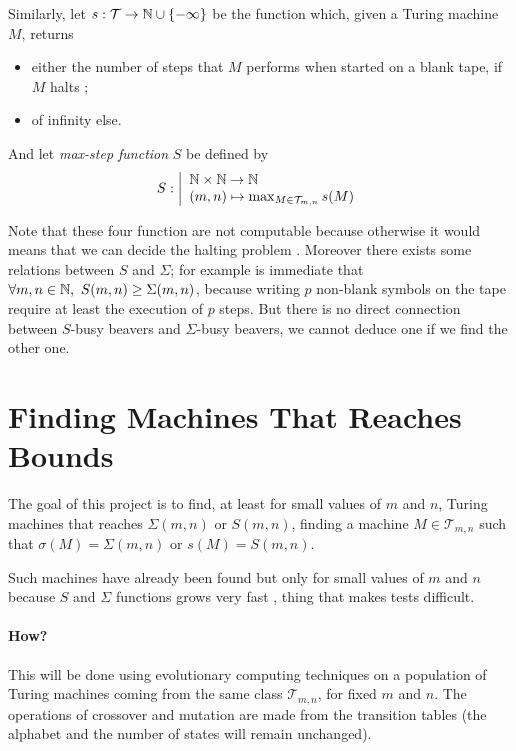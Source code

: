\documentclass{article}
\begin{document}
Similarly, let $s : \mathcal{T} \to \mathbb{N} \cup \{-\infty\}$ be the function which, given a Turing machine $M$, returns
\begin{itemize}
\item either the number of steps that $M$ performs when started on a blank tape, if $M$ halts ;
\item of infinity else.
\end{itemize}

And let \emph{max-step function} $S$ be defined by
\[
S : \left |
\begin{array}{l}
  \mathbb{N} \times \mathbb{N} \to \mathbb{N}\\
(m,n) \mapsto \max_{M \in \mathcal{T}_{m,n}} s(M)
\end{array}
\right .
\]

Note that these four function are not computable because otherwise it would means that we can decide the halting problem \cite{rado}. Moreover there exists some relations between $S$ and $\Sigma$; for example is immediate that $\forall m,n \in \mathbb{N},\ S(m,n) \geq \Sigma(m,n)$, because writing $p$ non-blank symbols on the tape require at least the execution of $p$ steps. But there is no direct connection between $S$-busy beavers and $\Sigma$-busy beavers, \ie we cannot deduce one if we find the other one.

\section{Finding Machines That Reaches Bounds}

The goal of this project is to find, at least for small values of $m$ and $n$, Turing machines that reaches $\Sigma(m,n)$ or $S(m,n)$, \ie finding a machine $M \in \mathcal{T}_{m,n}$ such that $\sigma(M) = \Sigma(m,n)$ or $s(M) = S(m,n)$.

Such machines have already been found \cite{rado} but only for small values of $m$ and $n$ because $S$ and $\Sigma$ functions grows very fast \cite{rado}, thing that makes tests difficult.


\paragraph{How?} This will be done using evolutionary computing techniques on a population of Turing machines coming from the same class $\mathcal{T}_{m,n}$, for fixed $m$ and $n$. The operations of crossover and mutation are made from the transition tables (the alphabet and the number of states will remain unchanged).
\end{document}
